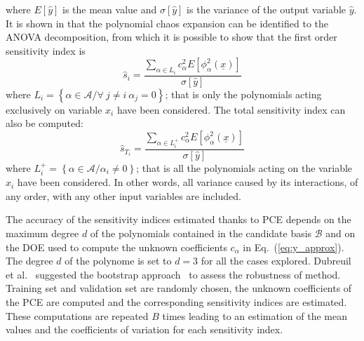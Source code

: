 where $E\left[\hat{y}\right]$ is the mean value and $\sigma\left[\hat{y}\right]$ is the variance of the output variable $\hat{y}$. It is shown in \cite{bib:sudret} that the polynomial chaos expansion can be identified to the ANOVA decomposition, from which it is possible to show that the first order sensitivity index is
\begin{equation}
\label{eq:sensitivity_index}
\hat{s}_i = \frac{\sum_{\alpha \in L_i}c^2_{\alpha}E[\phi_{\alpha}^2(\underline{x})]}{\sigma[\hat{y}]}
\end{equation}
where $L_i=\left\lbrace \alpha\in\mathcal{A}/ \forall~j\neq i~\alpha_j=0 \right\rbrace$; that is only the polynomials acting exclusively on variable $x_i$ have been considered. 
The total sensitivity index can also be computed: 
\begin{equation}
\label{eq:total_sensitivity_index}
\hat{s}_{T_i} = \frac{\sum_{\alpha \in L^+_i}c^2_{\alpha}E[\phi_{\alpha}^2(\underline{x})]}{\sigma[\hat{y}]}
\end{equation}
where $L^{+}_i=\left\lbrace \alpha\in\mathcal{A}/ \alpha_i\neq 0 \right\rbrace$; that is all the polynomials acting on the variable $x_i$ have been considered. In other words, all variance caused by its interactions, of any order, with any other input variables are included.

The accuracy of the sensitivity indices estimated thanks to PCE depends on the maximum degree $d$ of the polynomials contained in the candidate basis $\mathcal{B}$ and on the DOE used to compute the unknown coefficients $c_{\alpha}$ in Eq.~(\ref{eq:y_approx}). 
The degree $d$ of the polynome is set to $d=3$ for all the cases explored. 
Dubreuil et al.~\cite{bib:dubreuil} suggested the bootstrap approach~\cite{bib:efron} to assess the robustness of method. 
Training set and validation set are randomly chosen, the unknown coefficients of the PCE are computed and the corresponding sensitivity indices are estimated. 
These computations are repeated $B$ times leading to an estimation of the mean values and the coefficients of variation for each sensitivity index. 